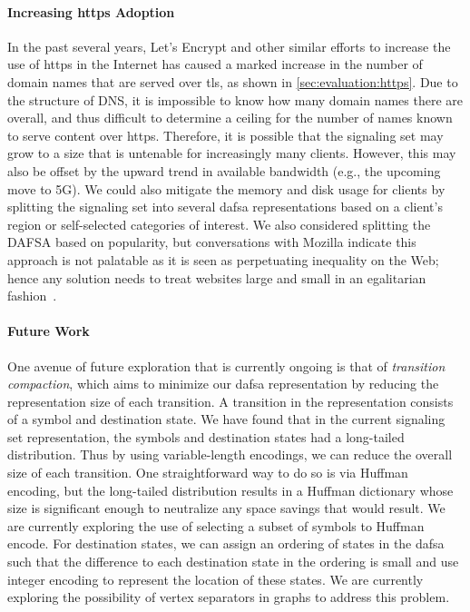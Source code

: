 \paragraph{Increasing \ac{https} Adoption}
In the past several years, Let's Encrypt and other similar efforts to increase
the use of \ac{https} in the Internet has caused a marked increase in the number
of domain names that are served over \ac{tls}, as shown in
\autoref{sec:evaluation:https}. Due to the structure of DNS, it is impossible to
know how many domain names there are overall, and thus difficult to determine a
ceiling for the number of names known to serve content over \ac{https}.
Therefore, it is possible that the signaling set may grow to a size that is
untenable for increasingly many clients.
However, this may also be offset by the upward trend in available bandwidth
(e.g., the upcoming move to 5G).
We could also mitigate the memory and disk usage for clients by splitting the 
signaling set into several \ac{dafsa} representations based 
on a client's region or self-selected categories of interest.
We also considered splitting the DAFSA based on popularity,
but conversations with Mozilla indicate this approach is not palatable
as it is seen as perpetuating inequality on the Web;
hence any solution needs to treat websites large and small 
in an egalitarian fashion~\cite{privatecomm}.

\paragraph{Future Work}
One avenue of future exploration that is currently ongoing is that of
\emph{transition compaction}, which aims to minimize our \ac{dafsa}
representation by reducing the representation size of each transition. A
transition in the representation consists of a symbol and destination state. We
have found that in the current signaling set representation, the symbols and
destination states had a long-tailed distribution. Thus by using variable-length
encodings, we can reduce the overall size of each transition. One
straightforward way to do so is via Huffman encoding, but the long-tailed
distribution results in a Huffman dictionary whose size is significant enough to
neutralize any space savings that would result. We are currently exploring the
use of selecting a subset of symbols to Huffman encode. For destination states,
we can assign an ordering of states in the \ac{dafsa} such that the difference
to each destination state in the ordering is small and use integer encoding to
represent the location of these states. We are currently exploring the
possibility of vertex separators in graphs to address this problem.


